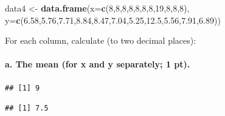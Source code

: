 \documentclass[]{article}
\newenvironment{Shaded}{\begin{snugshade}}{\end{snugshade}}
\newcommand{\KeywordTok}[1]{\textcolor[rgb]{0.13,0.29,0.53}{\textbf{#1}}}
\newcommand{\DataTypeTok}[1]{\textcolor[rgb]{0.13,0.29,0.53}{#1}}
\newcommand{\DecValTok}[1]{\textcolor[rgb]{0.00,0.00,0.81}{#1}}
\newcommand{\FloatTok}[1]{\textcolor[rgb]{0.00,0.00,0.81}{#1}}
\newcommand{\StringTok}[1]{\textcolor[rgb]{0.31,0.60,0.02}{#1}}
\newcommand{\OperatorTok}[1]{\textcolor[rgb]{0.81,0.36,0.00}{\textbf{#1}}}
\newcommand{\NormalTok}[1]{#1}
\let\oldparagraph\paragraph
\renewcommand{\paragraph}[1]{\oldparagraph{#1}\mbox{}}
\begin{document}
\begin{Shaded}
\begin{Highlighting}[]
\NormalTok{data4 <-}\StringTok{ }\KeywordTok{data.frame}\NormalTok{(}\DataTypeTok{x=}\KeywordTok{c}\NormalTok{(}\DecValTok{8}\NormalTok{,}\DecValTok{8}\NormalTok{,}\DecValTok{8}\NormalTok{,}\DecValTok{8}\NormalTok{,}\DecValTok{8}\NormalTok{,}\DecValTok{8}\NormalTok{,}\DecValTok{8}\NormalTok{,}\DecValTok{19}\NormalTok{,}\DecValTok{8}\NormalTok{,}\DecValTok{8}\NormalTok{,}\DecValTok{8}\NormalTok{),}
                    \DataTypeTok{y=}\KeywordTok{c}\NormalTok{(}\FloatTok{6.58}\NormalTok{,}\FloatTok{5.76}\NormalTok{,}\FloatTok{7.71}\NormalTok{,}\FloatTok{8.84}\NormalTok{,}\FloatTok{8.47}\NormalTok{,}\FloatTok{7.04}\NormalTok{,}\FloatTok{5.25}\NormalTok{,}\FloatTok{12.5}\NormalTok{,}\FloatTok{5.56}\NormalTok{,}\FloatTok{7.91}\NormalTok{,}\FloatTok{6.89}\NormalTok{))}
\end{Highlighting}
\end{Shaded}

For each column, calculate (to two decimal places):

\paragraph{a. The mean (for x and y separately; 1
pt).}\label{a.-the-mean-for-x-and-y-separately-1-pt.}

\begin{Shaded}
\end{Shaded}

\begin{verbatim}
## [1] 9
\end{verbatim}

\begin{Shaded}
\end{Shaded}

\begin{verbatim}
## [1] 7.5
\end{verbatim}

\begin{Shaded}
\end{Shaded}
\end{document}
